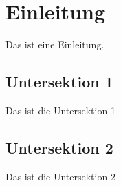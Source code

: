 \section{Einleitung}

Das ist eine Einleitung.

\subsection{Untersektion 1}
Das ist die Untersektion 1


\subsection{Untersektion 2}
Das ist die Untersektion 2

\newpage